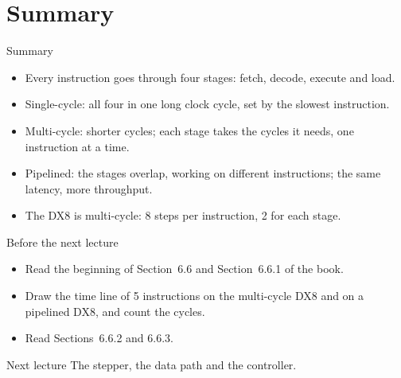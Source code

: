 \documentclass[10pt]{wosm-slides}
\begin{document}
\section{Summary}

\begin{frame}{Summary}
  \begin{itemize}
    \item Every instruction goes through four stages: fetch, decode, execute and
      load.
    \item Single-cycle: all four in one long clock cycle, set by the slowest
      instruction.
    \item Multi-cycle: shorter cycles; each stage takes the cycles it needs, one
      instruction at a time.
    \item Pipelined: the stages overlap, working on different instructions; the
      same latency, more throughput.
    \item The DX8 is multi-cycle: 8 steps per instruction, 2 for each stage.
  \end{itemize}
\end{frame}

\begin{frame}{Before the next lecture}
  \begin{itemize}
    \item Read the beginning of Section~6.6 and Section~6.6.1 of the book.
    \item Draw the time line of 5 instructions on the multi-cycle DX8 and on a
      pipelined DX8, and count the cycles.
    \item Read Sections~6.6.2 and 6.6.3.
  \end{itemize}

  \begin{block}{Next lecture }
    The stepper, the data path and the controller.
  \end{block}
\end{frame}
\end{document}
